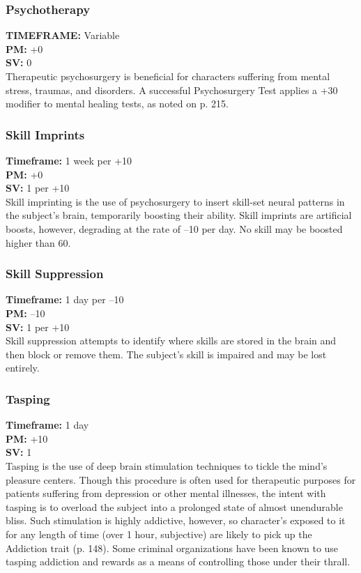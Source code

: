 \subsubsection{Psychotherapy}
\textbf{TIMEFRAME:} Variable \\
\textbf{PM:} +0 \\
\textbf{SV:} 0 \\
Therapeutic psychosurgery is beneficial for characters
suffering from mental stress, traumas, and disorders. A
successful Psychosurgery Test applies a +30 modifier
to mental healing tests, as noted on p. 215.

\subsubsection{Skill Imprints}
\textbf{Timeframe:} 1 week per +10 \\
\textbf{PM:} +0 \\
\textbf{SV:} 1 per +10 \\
Skill imprinting is the use of psychosurgery to insert
skill-set neural patterns in the subject’s brain, temporarily
boosting their ability. Skill imprints are artificial
boosts, however, degrading at the rate of –10 per day.
No skill may be boosted higher than 60.

\subsubsection{Skill Suppression}
\textbf{Timeframe:} 1 day per –10 \\
\textbf{PM:} –10 \\
\textbf{SV:} 1 per +10 \\
Skill suppression attempts to identify where skills are
stored in the brain and then block or remove them.
The subject’s skill is impaired and may be lost entirely.

\subsubsection{Tasping}
\textbf{Timeframe:} 1 day \\
\textbf{PM:} +10 \\
\textbf{SV:} 1 \\
Tasping is the use of deep brain stimulation techniques
to tickle the mind’s pleasure centers. Though this
procedure is often used for therapeutic purposes for
patients suffering from depression or other mental
illnesses, the intent with tasping is to overload the
subject into a prolonged state of almost unendurable
bliss. Such stimulation is highly addictive, however, so
character’s exposed to it for any length of time (over
1 hour, subjective) are likely to pick up the Addiction
trait (p. 148). Some criminal organizations have been
known to use tasping addiction and rewards as a
means of controlling those under their thrall.



